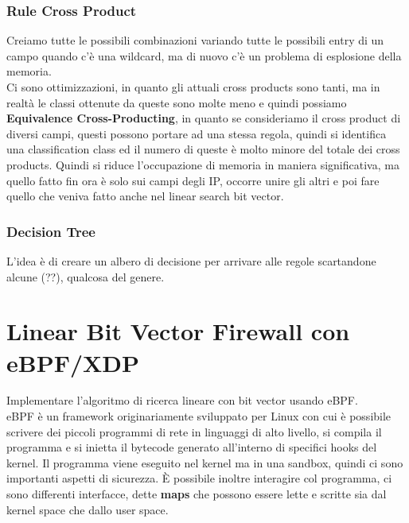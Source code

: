 \documentclass[12pt, oneside]{extbook} %
\begin{document}
\subsubsection{Rule Cross Product}
Creiamo tutte le possibili combinazioni variando tutte le possibili entry di un campo quando c'è una wildcard, ma di nuovo c'è un problema di esplosione della memoria.\\ Ci sono ottimizzazioni, in quanto gli attuali cross products sono tanti, ma in realtà le classi ottenute da queste sono molte meno e quindi possiamo \textbf{Equivalence Cross-Producting}, in quanto se consideriamo il cross product di diversi campi, questi possono portare ad una stessa regola, quindi si identifica una classification class ed il numero di queste è molto minore del totale dei cross products. Quindi si riduce l'occupazione di memoria in maniera significativa, ma quello fatto fin ora è solo sui campi degli IP, occorre unire gli altri e poi fare quello che veniva fatto anche nel linear search bit vector.
\subsubsection{Decision Tree}
L'idea è di creare un albero di decisione per arrivare alle regole scartandone alcune (??), qualcosa del genere.
\section{Linear Bit Vector Firewall con eBPF/XDP}
Implementare l'algoritmo di ricerca lineare con bit vector usando eBPF.\\ eBPF è un framework originariamente sviluppato per Linux con cui è possibile scrivere dei piccoli programmi di rete in linguaggi di alto livello, si compila il programma e si inietta il bytecode generato all'interno di specifici hooks del kernel. Il programma viene eseguito nel kernel ma in una sandbox, quindi ci sono importanti aspetti di sicurezza. È possibile inoltre interagire col programma, ci sono differenti interfacce, dette \textbf{maps} che possono essere lette e scritte sia dal kernel space che dallo user space.
\end{document}
